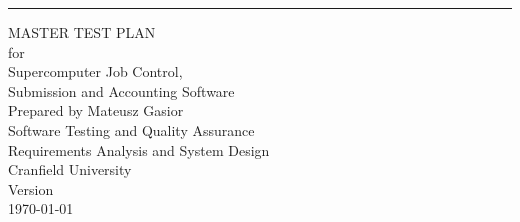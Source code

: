 	
\begin{titlepage}
	\begin{flushright}
		\rule{15cm}{5pt}\vskip1cm
		\begin{bfseries}
			\Huge{MASTER TEST PLAN}\\
			\vspace{2cm}
			\Large{for}\\
			\vspace{1.5cm}
			\LARGE{
				Supercomputer Job Control,\\
				Submission and Accounting Software\\
			}
			\vfill
			Prepared by Mateusz Gasior\\
			\vspace{2cm}
			\Large{
				Software Testing and Quality Assurance\\
				Requirements Analysis and System Design\\
				Cranfield University\\
			}
			\vfill
			\Large{Version \myversion}\\
			\vfill
			{\large \today}
		\end{bfseries}
	\end{flushright}
\end{titlepage}